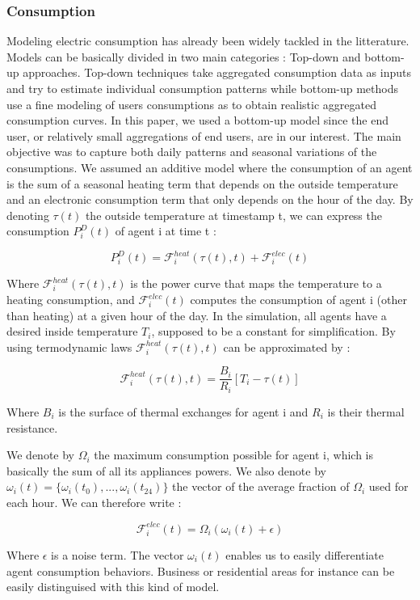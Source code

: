 \documentclass[conference]{IEEEtran}
\begin{document}
\subsubsection{Consumption}
Modeling electric consumption has already been widely tackled in the litterature. Models can be basically divided in two main categories : Top-down and bottom-up approaches. Top-down techniques take aggregated consumption data as inputs and try to estimate individual consumption patterns while bottom-up methods use a fine modeling of users consumptions as to obtain realistic aggregated consumption curves. In this paper, we used a bottom-up model since the end user, or relatively small aggregations of end users, are in our interest. The main objective was to capture both daily patterns and seasonal variations of the consumptions. We assumed an additive model where the consumption of an agent is the sum of a seasonal heating term that depends on the outside temperature and an electronic consumption term that only depends on the hour of the day. By denoting $ \tau(t) $ the outside temperature at timestamp t, we can express the consumption $ P_{i}^{D}(t) $ of agent i at time t :

\begin{equation}
P_{i}^{D}(t) = \mathcal{F}_{i}^{heat}(\tau(t), t) + \mathcal{F}_{i}^{elec}(t)
\end{equation}

Where $ \mathcal{F}_{i}^{heat}(\tau(t), t) $ is the power curve that maps the temperature to a heating consumption, and $ \mathcal{F}_{i}^{elec}(t) $ computes the consumption of agent i (other than heating) at a given hour of the day. In the simulation, all agents have a desired inside temperature $ T_{i} $, supposed to be a constant for simplification. By using termodynamic laws $ \mathcal{F}_{i}^{heat}(\tau(t), t) $ can be approximated by :

\begin{equation}
\mathcal{F}_{i}^{heat}(\tau(t), t) = \dfrac{B_{i}}{R_{i}} \left[ T_{i} - \tau(t) \right]
\end{equation}

Where $ B_{i} $ is the surface of thermal exchanges for agent i and $ R_{i} $ is their thermal resistance.

We denote by $ \Omega_{i} $ the maximum consumption possible for agent i, which is basically the sum of all its appliances powers. We also denote by $ \omega_{i}(t) = \{ \omega_{i}(t_{0}),...,\omega_{i}(t_{24}) \} $ the vector of the average fraction of $ \Omega_{i} $ used for each hour. We can therefore write :

\begin{equation}
\mathcal{F}_{i}^{elec}(t) = \Omega_{i} ( \omega_{i}(t) + \epsilon )
\end{equation}

Where $ \epsilon $ is a noise term. The vector $ \omega_{i}(t) $ enables us to easily differentiate agent consumption behaviors. Business or residential areas for instance can be easily distinguised with this kind of model.
\end{document}

